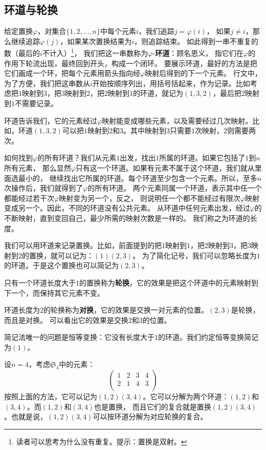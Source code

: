 \documentclass[12pt,UTF8,fontset=none]{ctexbook}
\begin{document}
\subsection{环道与轮换}
给定置换$\varphi$，对集合$\{1,2,\ldots, n\}$中每个元素$i$，我们追踪$j = \varphi(i)$，
如果$j\neq i$，那么继续追踪$\varphi(j)$，如果某次置换结果为$i$，则追踪结束。
如此得到一串不重复的数（最后的$i$不计入）\footnote{读者可以思考为什么没有重复。提示：置换是双射。}，
我们把这一串数称为$\varphi$-\textbf{环道}：顾名思义，
指它们在$\varphi$的作用下轮流出现，最终回到开头，构成一个闭环。
要展示环道，最好的方法是把它们画成一个环，把每个元素用箭头指向经$\varphi$映射后得到的下一个元素。
行文中，为了方便，我们把这串数从$i$开始按顺序列出，用括号括起来，作为记录。比如考虑把$1$映射到$3$，把$3$映射到$2$，把$2$映射到$1$的环道，就记为$(1,3,2)$，最后把$2$映射到$1$不需要记录。

环道告诉我们，它的元素经过$\varphi$映射能变成哪些元素，以及需要经过几次映射。比如，环道$(1,3,2)$可以把$1$映射到$2$和$3$。其中映射到$3$只需要$1$次映射，$2$则需要两次。

如何找到$\varphi$的所有环道？我们从元素$1$出发，找出$1$所属的环道。如果它包括了$1$到$n$所有元素，
那么显然$\varphi$只有这一个环道。如果有元素不属于这个环道，我们就从里面选最小的，
继续找出它所属的环道。每个环道至少包含一个元素。所以，至多$n$次操作后，我们就得到了$\varphi$的所有环道。
两个元素同属一个环道，表示其中任一个都能经过若干次$\varphi$映射变为另一个，反之，
则说明任一个都不能经过有限次$\varphi$映射变成另一个。因此，不同的环道没有公共元素。
从环道中任何元素出发，经过$\varphi$的不断映射，直到变回自己，最少所需的映射次数是一样的。
我们称之为环道的长度。

我们可以用环道来记录置换。比如，前面提到的把$1$映射到$1$，把$2$映射到$3$，把$3$映射到$2$的置换，就可以记为：$(1)(2, 3)$。
为了简化记号，我们可以忽略长度为$1$的环道。于是这个置换也可以简记为$(2, 3)$。

只有一个环道长度大于$1$的置换称为\textbf{轮换}，它的效果是把这个环道中的元素映射到下一个，而保持其它元素不变。

环道长度为$2$的轮换称为\textbf{对换}，它的效果是交换一对元素的位置。$(2, 3)$是轮换，而且是对换。
可以看出它的效果是交换$2$和$3$的位置。

简记法唯一的问题是恒等变换：它没有长度大于$1$的环道。我们约定恒等变换简记为$(1)$。

设$n=4$，考虑$\mathfrak{S}_4$中的元素：
$$ \begin{pmatrix}
    1 & 2 & 3 & 4 \\ 2 & 1 & 4 & 3\\
\end{pmatrix} $$
按照上面的方法，它可以记为$(1, 2)(3, 4)$。它可以分解为两个环道：$(1, 2)$和$(3, 4)$。而$(1, 2)$和$(3, 4)$也是置换，
而且它们的复合就是置换$(1, 2)(3, 4)$。也就是说，$(1, 2)(3, 4)$可以按环道分解为对应轮换的复合。
\end{document}
